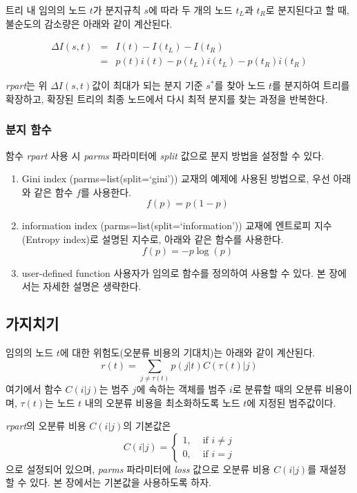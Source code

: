 \documentclass[
]{book}
\providecommand{\tightlist}{%
  \setlength{\itemsep}{0pt}\setlength{\parskip}{0pt}}
\begin{document}
트리 내 임의의 노드 \(t\)가 분지규칙 \(s\)에 따라 두 개의 노드 \(t_L\)과 \(t_R\)로 분지된다고 할 때, 불순도의 감소량은 아래와 같이 계산된다.

\begin{eqnarray}
\Delta I(s,t) &=& I(t) - I(t_L) - I(t_R)\\ &=& p(t)i(t) - p(t_L)i(t_L) - p(t_R)i(t_R) 
\end{eqnarray}

\emph{rpart}는 위 \(\Delta I(s,t)\)값이 최대가 되는 분지 기준 \(s^*\)를 찾아 노드 \(t\)를 분지하여 트리를 확장하고, 확장된 트리의 최종 노드에서 다시 최적 분지를 찾는 과정을 반복한다.

\hypertarget{uxbd84uxc9c0-uxd568uxc218}{%
\subsubsection{분지 함수}\label{uxbd84uxc9c0-uxd568uxc218}}

함수 \emph{rpart} 사용 시 \emph{parms} 파라미터에 \emph{split} 값으로 분지 방법을 설정할 수 있다.

\begin{enumerate}
\def\labelenumi{\arabic{enumi}.}
\tightlist
\item
  Gini index (parms=list(split=`gini'))
  교재의 예제에 사용된 방법으로, 우선 아래와 같은 함수 \(f\)를 사용한다.
  \[f(p) = p(1-p)\]
\item
  information index (parms=list(split=`information'))
  교재에 엔트로피 지수(Entropy index)로 설명된 지수로, 아래와 같은 함수를 사용한다.
  \[f(p) = -p\log(p)\]
\item
  user-defined function
  사용자가 임의로 함수를 정의하여 사용할 수 있다. 본 장에서는 자세한 설명은 생략한다.
\end{enumerate}

\hypertarget{cart-r-pkg-pruning}{%
\subsection{가지치기}\label{cart-r-pkg-pruning}}

임의의 노드 \(t\)에 대한 위험도(오분류 비용의 기대치)는 아래와 같이 계산된다.
\[r(t) = \sum_{j \neq \tau(t)} p(j|t)C\left(\tau(t)|j\right)\]
여기에서 함수 \(C(i|j)\)는 범주 \(j\)에 속하는 객체를 범주 \(i\)로 분류할 때의 오분류 비용이며, \(\tau(t)\)는 노드 \(t\) 내의 오분류 비용을 최소화하도록 노드 \(t\)에 지정된 범주값이다.

\emph{rpart}의 오분류 비용 \(C(i|j)\)의 기본값은
\[C(i|j) = 
\begin{cases} 1,  & \text{  if } i \neq j\\
              0,  & \text{  if } i = j
\end{cases} \]
으로 설정되어 있으며, \emph{parms} 파라미터에 \emph{loss} 값으로 오분류 비용 \(C(i|j)\)를 재설정할 수 있다. 본 장에서는 기본값을 사용하도록 하자.
\end{document}
